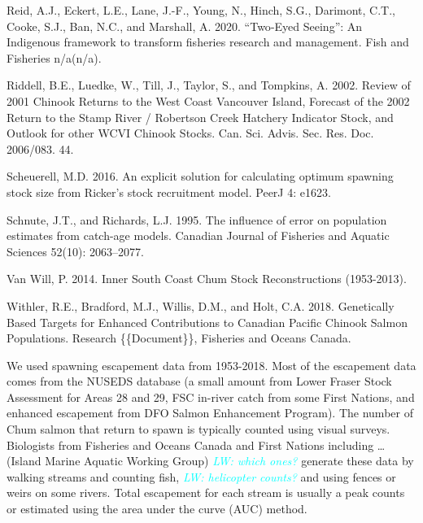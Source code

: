 \documentclass[11pt]{book}
\begin{document}
\begin{CSLReferences}{1}{0}
%
Reid, A.J., Eckert, L.E., Lane, J.-F., Young, N., Hinch, S.G., Darimont, C.T., Cooke, S.J., Ban, N.C., and Marshall, A. 2020. {``{Two}-{Eyed Seeing}''}: An {Indigenous} framework to transform fisheries research and management. Fish and Fisheries n/a(n/a).

%
Riddell, B.E., Luedke, W., Till, J., Taylor, S., and Tompkins, A. 2002. Review of 2001 {Chinook Returns} to the {West Coast Vancouver Island}, {Forecast} of the 2002 {Return} to the {Stamp River} / {Robertson Creek Hatchery Indicator Stock}, and {Outlook} for other {WCVI Chinook Stocks}. Can. Sci. Advis. Sec. Res. Doc. 2006/083. 44.

%
Scheuerell, M.D. 2016. An explicit solution for calculating optimum spawning stock size from {Ricker}'s stock recruitment model. PeerJ 4: e1623.

%
Schnute, J.T., and Richards, L.J. 1995. The influence of error on population estimates from catch-age models. Canadian Journal of Fisheries and Aquatic Sciences 52(10): 2063--2077.

%
Van Will, P. 2014. Inner {South Coast Chum Stock Reconstructions} (1953-2013).

%
Withler, R.E., Bradford, M.J., Willis, D.M., and Holt, C.A. 2018. Genetically {Based Targets} for {Enhanced Contributions} to {Canadian Pacific Chinook Salmon Populations}. Research \{\{Document\}\}, {Fisheries and Oceans Canada}.

\end{CSLReferences}
\setlength{\parindent}{0in} \setlength{\leftskip}{0in} \setlength{\parskip}{4pt}

\Appendices


\clearpage

\label{app:first-appendix}

\hypertarget{spawner-counts-escapement}{%
\label{spawner-counts-escapement}}

We used spawning escapement data from 1953-2018. Most of the escapement data comes from the NUSEDS database (a small amount from Lower Fraser Stock Assessment for Areas 28 and 29, FSC in-river catch from some First Nations, and enhanced escapement from DFO Salmon Enhancement Program). The number of Chum salmon that return to spawn is typically counted using visual surveys. Biologists from Fisheries and Oceans Canada and First Nations including \ldots{} (Island Marine Aquatic Working Group) \emph{\textcolor{cyan}{LW: which ones?}} generate these data by walking streams and counting fish, \emph{\textcolor{cyan}{LW: helicopter counts?}} and using fences or weirs on some rivers. Total escapement for each stream is usually a peak counts or estimated using the area under the curve (AUC) method.
\end{document}
